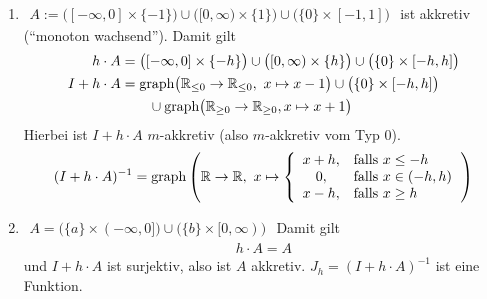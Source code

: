 \begin{beispiel}[Beispiele für $X=\R$]\
\begin{enumerate}[label=(\alph*)]
\item $\begin{aligned}
A:=\big([-\infty,0]\times\lbrace-1\rbrace\big)\cup\big([0,\infty)\times\lbrace 1\rbrace\big)\cup\big(\lbrace0\rbrace\times[-1,1]\big)
\end{aligned}$
ist akkretiv (``monoton wachsend''). Damit gilt
\begin{align*}
h\cdot A&=\big([-\infty,0]\times\lbrace-h\rbrace\big)\cup\big([0,\infty)\times\lbrace h\rbrace\big)\cup\big(\lbrace0\rbrace\times[-h,h]\big)\\
I+h\cdot A&=\text{graph}\big(\mathbb{R}_{\leq0}\to\mathbb{R}_{\leq0},~x\mapsto x-1\big)\cup\big(\lbrace 0\rbrace\times [-h,h]\big)\\
&\qquad\cup\text{graph}\big(\mathbb{R}_{\geq0}\to\mathbb{R}_{\geq0},x\mapsto x+1\big)
\end{align*}
Hierbei ist $I+h\cdot A$ $m$-akkretiv (also $m$-akkretiv vom Typ 0).
\begin{align*}
(I+h\cdot A)^{-1}=\text{graph}\left(\mathbb{R}\to\mathbb{R},~x\mapsto\left\lbrace\begin{array}{cl}
x+h, & \text{falls } x\leq -h\\
0, & \text{falls } x\in(-h,h)\\
x-h, & \text{falls } x\geq h
\end{array}\right.\right)
\end{align*}
\item $\begin{aligned}
A=\big(\lbrace a\rbrace\times (-\infty,0]\big)\cup\big(\lbrace b\rbrace\times[0,\infty)\big)
\end{aligned}$
Damit gilt
\begin{align*}
h\cdot A=A
\end{align*} %
und $I+h\cdot A$ ist surjektiv, also ist $A$ akkretiv. $J_h=(I+h\cdot A)^{-1}$ ist eine Funktion.
\end{enumerate}
\end{beispiel}


